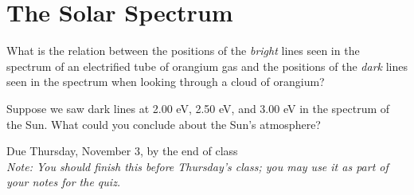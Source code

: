 \documentclass[12pt]{article}
\begin{document}
\section{The Solar Spectrum}

What is the relation between the positions of the {\it bright} lines seen in the spectrum of an electrified tube of orangium gas and the positions of the {\it dark} lines seen in the spectrum when looking through a cloud of orangium?

\vspace{0.5in}

Suppose we saw dark lines at 2.00 eV, 2.50 eV, and 3.00 eV in the spectrum of the Sun. What could you conclude about the Sun's atmosphere?


\newpage

\centerline{}
	
	\normalsize
	\begin{center}
		Due Thursday, November 3, by the end of class\\
		\small \it Note: You should finish this before Thursday's class; you may use it as part of your notes for the quiz.
	\end{center}
	
	\bigskip
	
\end{document}
